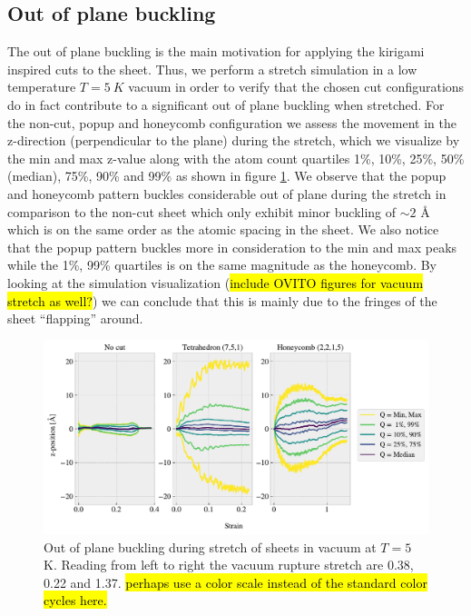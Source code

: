 \subsection{Out of plane buckling}

The out of plane buckling is the main motivation for applying the kirigami
inspired cuts to the sheet. Thus, we perform a stretch simulation in a low
temperature $T = \SI{5}{K}$ vacuum in order to verify that the chosen cut
configurations do in fact contribute to a significant out of plane buckling when
stretched. For the non-cut, popup and honeycomb configuration we assess the
movement in the z-direction (perpendicular to the plane) during the stretch,
which we visualize by the min and max z-value along with the atom count
quartiles 1\%, 10\%, 25\%, 50\% (median), 75\%, 90\% and 99\% as shown in figure
\ref{fig:buckling_quartiles}. We observe that the popup and honeycomb pattern
buckles considerable out of plane during the stretch in comparison to the non-cut sheet which only exhibit minor buckling of $\sim 2$ Å which is on the same order as the
atomic spacing in the sheet. We also notice that the popup pattern
buckles more in consideration to the min and max peaks while the 1\%, 99\%
quartiles is on the same magnitude as the honeycomb. By looking at the simulation visualization
(\hl{include OVITO figures for vacuum stretch as well?}) we can conclude that this is mainly due to the fringes
of the sheet ``flapping'' around. 


\begin{figure}[H]
  \centering
  \includegraphics[width=\linewidth]{figures/baseline/vacuum_normal_buckling}
  \caption{Out of plane buckling during stretch of sheets in vacuum at $T = 5$ K. Reading from left to right the vacuum rupture stretch are 0.38, 0.22 and 1.37. \hl{perhaps use a color scale instead of the standard color cycles here.}}
  \label{fig:buckling_quartiles}
\end{figure}


